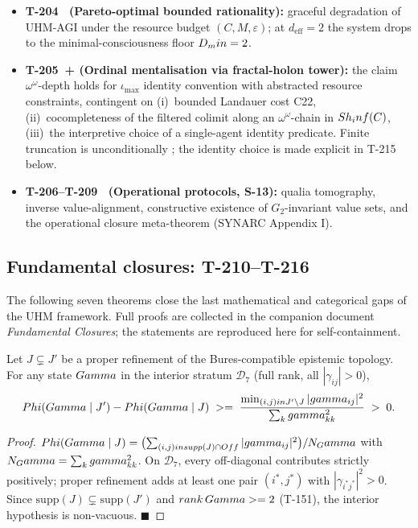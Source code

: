 \begin{itemize}[leftmargin=2em,nosep]
  \item \textbf{T-204~ (Pareto-optimal bounded rationality):}
        graceful degradation of UHM-AGI under the resource budget
        $(C, M, \varepsilon)$; at $d_{\mathrm{eff}} = 2$ the system drops
        to the minimal-consciousness floor $D_min = 2$.
  \item \textbf{T-205~+ (Ordinal mentalisation via
        fractal-holon tower):} the claim
        $\omega^\omega$-depth holds for $\iota_{\max}$ identity
        convention with abstracted resource constraints, contingent on
        (i)~bounded Landauer cost C22, (ii)~cocompleteness of the
        filtered colimit along an $\omega^\omega$-chain in
        $Sh_inf(C)$, (iii)~the interpretive choice of a
        single-agent identity predicate. Finite truncation is
        unconditionally ; the identity choice is made explicit
        in T-215 below.
  \item \textbf{T-206--T-209~ (Operational protocols, S-13):}
        qualia tomography, inverse value-alignment, constructive
        existence of $G_2$-invariant value sets, and the operational
        closure meta-theorem (SYNARC Appendix I).
\end{itemize}

\subsection{Fundamental closures: T-210--T-216}
\label{subsec:fundamental-closures}

The following seven theorems close the last mathematical and
categorical gaps of the UHM framework. Full proofs are collected in the
companion document \emph{Fundamental Closures}; the statements are
reproduced here for self-containment.

\begin{theorembox}
\label{thm:t210-strict-phi}
Let $J \subsetneq J'$ be a proper refinement of the Bures-compatible
epistemic topology. For any state $Gamma$ in the interior stratum
$\mathcal D_7$ (full rank, all $|\gamma_{ij}| > 0$),
\[
  Phi(Gamma \mid J') - Phi(Gamma \mid J) \;>=\;
  \frac{\min_{(i,j) in J' \setminus J}|gamma_{ij}|^2}
       {\sum_k gamma_{kk}^2} \;>\; 0.
\]
\end{theorembox}

\begin{proof}
$Phi(Gamma \mid J) = \bigl(\sum_{(i,j) in supp(J) \cap
Off} |gamma_{ij}|^2\bigr) / N_Gamma$ with $N_Gamma =
\sum_k gamma_{kk}^2$. On $\mathcal D_7$, every off-diagonal contributes
strictly positively; proper refinement adds at least one pair
$(i^*, j^*)$ with $|\gamma_{i^*j^*}|^2 > 0$. Since $\mathrm{supp}(J)
\subsetneq \mathrm{supp}(J')$ and $rank\,Gamma >= 2$ (T-151),
the interior hypothesis is non-vacuous. $\blacksquare$
\end{proof}

